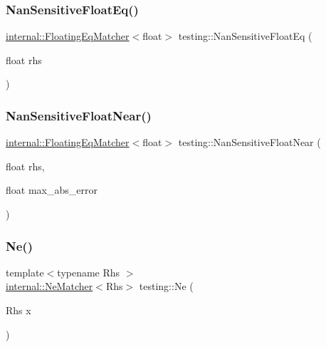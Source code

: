 \mbox{\label{namespacetesting_ab3653439a654b85bdccff46d1436670d}} 
\subsubsection{\texorpdfstring{Nan\+Sensitive\+Float\+Eq()}{NanSensitiveFloatEq()}}
{\footnotesize\ttfamily \hyperlink{classtesting_1_1internal_1_1_floating_eq_matcher}{internal\+::\+Floating\+Eq\+Matcher}$<$float$>$ testing\+::\+Nan\+Sensitive\+Float\+Eq (\begin{DoxyParamCaption}\item[{float}]{rhs }\end{DoxyParamCaption})\hspace{0.3cm}{\ttfamily [inline]}}

\mbox{\label{namespacetesting_a347ebf0075ca9470e71e8ac468c9818f}} 
\subsubsection{\texorpdfstring{Nan\+Sensitive\+Float\+Near()}{NanSensitiveFloatNear()}}
{\footnotesize\ttfamily \hyperlink{classtesting_1_1internal_1_1_floating_eq_matcher}{internal\+::\+Floating\+Eq\+Matcher}$<$float$>$ testing\+::\+Nan\+Sensitive\+Float\+Near (\begin{DoxyParamCaption}\item[{float}]{rhs,  }\item[{float}]{max\+\_\+abs\+\_\+error }\end{DoxyParamCaption})\hspace{0.3cm}{\ttfamily [inline]}}

\mbox{\label{namespacetesting_afe42d41d5171234cb9da5da27faeb7e8}} 
\subsubsection{\texorpdfstring{Ne()}{Ne()}\hspace{0.1cm}{\footnotesize\ttfamily [1/2]}}
{\footnotesize\ttfamily template$<$typename Rhs $>$ \\
\hyperlink{classtesting_1_1internal_1_1_ne_matcher}{internal\+::\+Ne\+Matcher}$<$Rhs$>$ testing\+::\+Ne (\begin{DoxyParamCaption}\item[{Rhs}]{x }\end{DoxyParamCaption})\hspace{0.3cm}{\ttfamily [inline]}}

